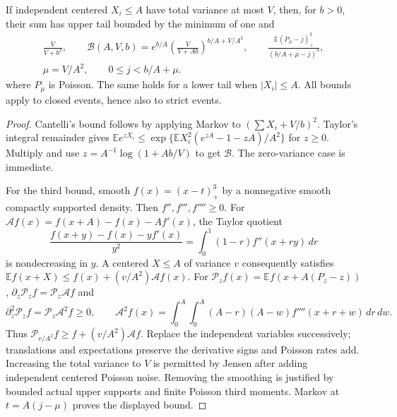 \begin{lemma}\label{j:local:shortloc:tails}
If independent centered $X_i\le A$ have total variance at most $V$, then,
for $b>0$, their sum has upper tail bounded by the minimum of one and
\begin{equation}\label{j:local:shortloc:tailmin}
 \begin{gathered}
 \frac{V}{V+b^2},\qquad
 \mathcal B(A,V,b)=e^{b/A}\left(\frac{V}{V+Ab}\right)^{b/A+V/A^2},\qquad
 \frac{\mathbb E(P_\mu-j)_+^3}{(b/A+\mu-j)^3},\\
 \mu=V/A^2,\qquad 0\le j<b/A+\mu.
 \end{gathered}
\end{equation}
where $P_\mu$ is Poisson. The same holds for a lower tail when $|X_i|\le A$.
All bounds apply to closed events, hence also to strict events.
\end{lemma}
\begin{proof}
Cantelli's bound follows by applying Markov to $(\sum X_i+V/b)^2$.
Taylor's integral remainder gives
$\mathbb E e^{zX_i}\le\exp\{\mathbb E X_i^2(e^{zA}-1-zA)/A^2\}$
for $z\ge0$. Multiply and use $z=A^{-1}\log(1+Ab/V)$ to get $\mathcal B$.
The zero-variance case is immediate.

For the third bound, smooth $f(x)=(x-t)_+^3$ by a nonnegative smooth
compactly supported density. Then $f'',f''',f''''\ge0$. For
$\mathcal Af(x)=f(x+A)-f(x)-Af'(x)$, the Taylor quotient
\[
 \frac{f(x+y)-f(x)-yf'(x)}{y^2}
       =\int_0^1(1-r)f''(x+ry)\,dr
\]
is nondecreasing in $y$. A centered $X\le A$ of variance $v$ consequently
satisfies $\mathbb E f(x+X)\le f(x)+(v/A^2)\mathcal Af(x)$.
For $\mathcal P_zf(x)=\mathbb E f(x+A(P_z-z))$,
$\partial_z\mathcal P_zf=\mathcal P_z\mathcal Af$ and
\[
 \partial_z^2\mathcal P_zf=\mathcal P_z\mathcal A^2f\ge0,\qquad
 \mathcal A^2f(x)=\int_0^A\!\int_0^A(A-r)(A-w)f''''(x+r+w)\,dr\,dw.
\]
Thus $\mathcal P_{v/A^2}f\ge f+(v/A^2)\mathcal Af$. Replace the independent
variables successively; translations and expectations preserve the derivative
signs and Poisson rates add. Increasing the total variance to $V$ is permitted
by Jensen after adding independent centered Poisson noise. Removing the
smoothing is justified by bounded actual upper supports and finite Poisson
third moments. Markov at $t=A(j-\mu)$ proves the displayed bound.
\end{proof}

